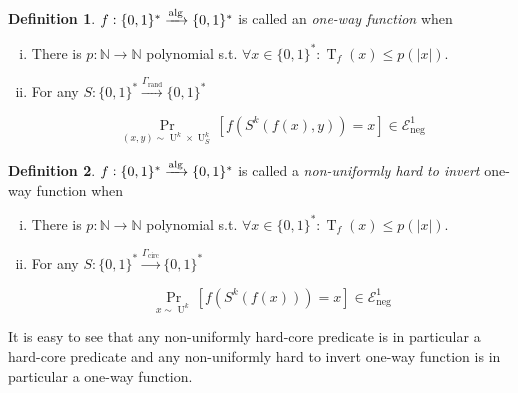\documentclass{article}
\numberwithin{equation}{section}
\theoremstyle{definition}
\newtheorem{definition}{Definition}[section]
\theoremstyle{plain}
\newcommand{\Bool}{\{0,1\}}
\newcommand{\Words}{{\Bool^*}}
\DeclareMathOperator{\Prb}{Pr}
\DeclareMathOperator{\T}{T}
\DeclareMathOperator{\U}{U}
\newcommand{\Nats}{\mathbb{N}}
\newcommand{\Abs}[1]{\lvert #1 \rvert}
\newcommand{\Fall}{\mathcal{E}}
\newcommand{\Alg}{\xrightarrow{\textnormal{alg}}}
\begin{document}
\begin{samepage}
\begin{definition}

$f: \Words \Alg \Words$ is called an \emph{one-way function}
when

\begin{enumerate}[(i)]

\item There is $p: \Nats \rightarrow \Nats$ polynomial s.t. $\forall x \in \Words: \T_f(x) \leq p(\Abs{x})$.

\item For any $S: \Words \xrightarrow{\Gamma_{\text{rand}}} \Words$

\begin{equation}
\Prb_{(x,y) \sim \U^k \times \U_S^k}[f(S^k(f(x),y))=x] \in \Fall_{\text{neg}}^1
\end{equation}

\end{enumerate}

\end{definition}
\end{samepage}

\begin{samepage}
\begin{definition}

$f: \Words \Alg \Words$ is called a \emph{non-uniformly hard to invert} one-way function
when

\begin{enumerate}[(i)]

\item There is $p: \Nats \rightarrow \Nats$ polynomial s.t. $\forall x \in \Words: \T_f(x) \leq p(\Abs{x})$.

\item For any $S: \Words \xrightarrow{\Gamma_{\text{circ}}} \Words$

\begin{equation}
\Prb_{x \sim \U^k}[f(S^k(f(x)))=x] \in \Fall_{\text{neg}}^1
\end{equation}

\end{enumerate}

\end{definition}
\end{samepage}

It is easy to see that any non-uniformly hard-core predicate is in particular a hard-core predicate and any non-uniformly hard to invert one-way function is in particular a one-way function.
\end{document}
